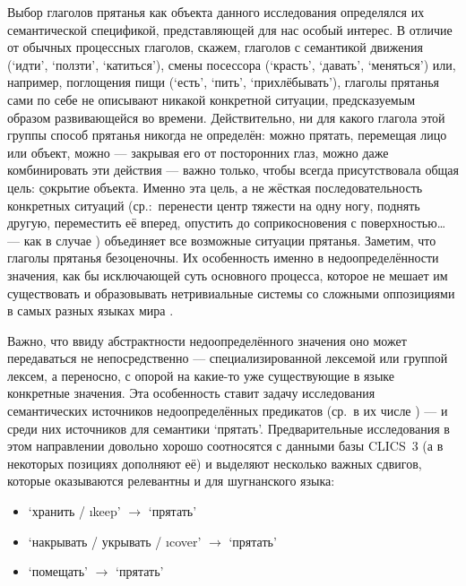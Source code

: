 Выбор глаголов прятанья как объекта данного исследования определялся их семантической спецификой, представляющей для нас особый интерес. В отличие от обычных процессных глаголов, скажем, глаголов с семантикой движения (‘идти’, ‘ползти’, ‘катиться’), смены посессора (‘красть’, ‘давать’, ‘меняться’) или, например, поглощения пищи (‘есть’, ‘пить’, ‘прихлёбывать’), глаголы прятанья сами по себе не описывают никакой конкретной ситуации, предсказуемым образом развивающейся во времени. Действительно, ни для какого глагола этой группы способ прятанья никогда не определён: можно прятать, перемещая лицо или объект, можно — закрывая его от посторонних глаз, можно даже комбинировать эти действия — важно только, чтобы всегда присутствовала общая цель: \b{сокрытие объекта}. Именно эта цель, а не жёсткая последовательность конкретных ситуаций (ср.:~перенести центр тяжести на одну ногу, поднять другую, переместить её вперед, опустить до соприкосновения с поверхностью… — как в случае ) объединяет все возможные ситуации прятанья. Заметим, что глаголы прятанья безоценочны. Их особенность именно в недоопределённости значения, как бы исключающей суть основного процесса, которое не мешает им существовать и образовывать нетривиальные системы со сложными оппозициями в самых разных языках мира \parencite{reznikova2022}.

Важно, что ввиду абстрактности недоопределённого значения оно может передаваться не непосредственно — специализированной лексемой или группой лексем, а переносно, с опорой на какие-то уже существующие в языке конкретные значения. Эта особенность ставит задачу исследования семантических источников недоопределённых предикатов (ср.~в их числе ) — и среди них источников для семантики ‘прятать’. Предварительные исследования в этом направлении \parencite{reznikova2022} довольно хорошо соотносятся с данными базы CLICS~3 \parencite{clics2020} (а в некоторых позициях дополняют её) и выделяют несколько важных сдвигов, которые оказываются релевантны и для шугнанского языка:

\begin{itemize}
  \item ‘хранить / \i{keep}’ $\rightarrow$ ‘прятать’
  \item ‘накрывать / укрывать / \i{cover}’ $\rightarrow$ ‘прятать’
  \item ‘помещать’ $\rightarrow$ ‘прятать’
\end{itemize}

